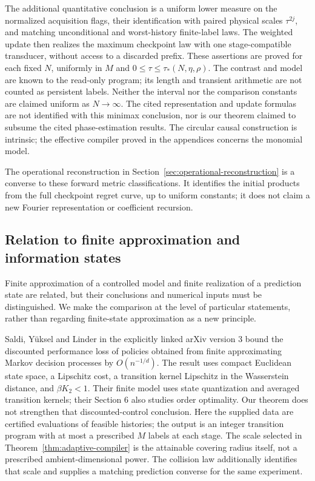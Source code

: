 \documentclass[11pt]{amsart}
\theoremstyle{definition}\newtheorem{definition}[theorem]{Definition}
\theoremstyle{remark}\newtheorem{remark}[theorem]{Remark}
\begin{document}
The additional quantitative conclusion is a uniform lower measure on
the normalized acquisition flags, their identification with paired
physical scales $\tau^{2j}$, and matching unconditional and worst-history
finite-label laws. The weighted update then realizes the maximum
checkpoint law with one stage-compatible transducer, without access
to a discarded prefix. These assertions are proved for each fixed
$N$, uniformly in $M$ and $0\le\tau\le\tau_*(N,\eta,\rho)$.
The contrast and model are known to the read-only program; its length
and transient arithmetic are not counted as persistent labels.
Neither the interval nor the comparison constants are claimed uniform
as $N\to\infty$. The cited representation and update formulas are
not identified with this minimax conclusion, nor is our theorem claimed
to subsume the cited phase-estimation results. The circular causal
construction is intrinsic; the effective compiler proved in the
appendices concerns the monomial model.

The operational reconstruction in
Section~\ref{sec:operational-reconstruction} is a converse to these
forward metric classifications. It identifies the initial products
from the full checkpoint regret curve, up to uniform constants; it
does not claim a new Fourier representation or coefficient recursion.

\subsection{Relation to finite approximation and information states}
Finite approximation of a controlled model and finite realization of a
prediction state are related, but their conclusions and numerical inputs
must be distinguished. We make the comparison at the level of particular
statements, rather than regarding finite-state approximation as a new
principle.

Saldi, Y\"uksel and Linder \cite[Theorem 5.2]{SaldiYukselLinder}
in the explicitly linked arXiv version 3
bound the discounted performance loss of policies obtained from finite
approximating Markov decision processes by $O(n^{-1/d})$. The result
uses compact Euclidean state space, a Lipschitz cost, a transition kernel
Lipschitz in the Wasserstein distance, and $\beta K_2<1$. Their finite
model uses state quantization and averaged transition kernels; their
Section 6 also studies order optimality. Our theorem does not strengthen
that discounted-control conclusion. Here the supplied data are certified
evaluations of feasible histories; the output is an integer transition
program with at most a prescribed $M$ labels at each stage. The scale
selected in Theorem~\ref{thm:adaptive-compiler} is the attainable
covering radius itself, not a prescribed ambient-dimensional power.
The collision law additionally identifies that scale and supplies a
matching prediction converse for the same experiment.
\end{document}
